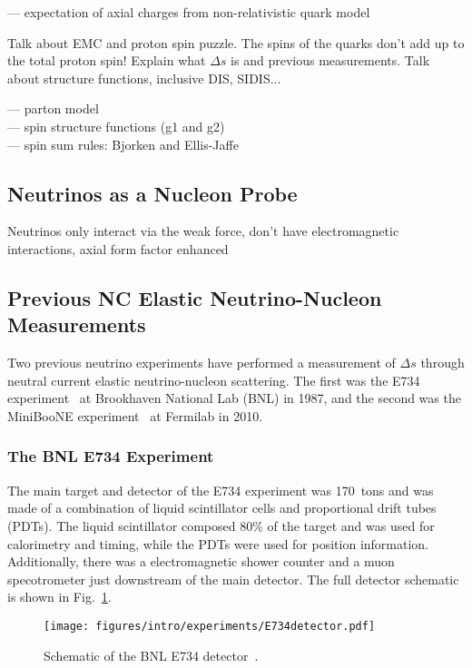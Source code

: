   --- expectation of axial charges from non-relativistic quark model

  Talk about EMC and proton spin puzzle. The spins of the quarks don't add up
  to the total proton spin! Explain what $\Delta s$ is and previous
  measurements. Talk about structure functions, inclusive DIS, SIDIS...

  --- parton model \\
  --- spin structure functions (g1 and g2) \\
  --- spin sum rules: Bjorken and Ellis-Jaffe \\


\subsection{Neutrinos as a Nucleon Probe}\label{sec:neutrinos}

  Neutrinos only interact via the weak force, don't have electromagnetic
  interactions, axial form factor enhanced

  \subsection{Previous NC Elastic Neutrino-Nucleon Measurements}
  \label{sec:measurements}
    Two previous neutrino experiments have performed a measurement of $\Delta
    s$ through neutral current elastic neutrino-nucleon scattering. The first
    was the E734 experiment~\cite{E734nce} at Brookhaven National Lab (BNL) in
    1987, and the second was the MiniBooNE experiment~\cite{MiniBooNEnce} at
    Fermilab in 2010.

    \subsubsection{The BNL E734 Experiment}\label{sec:e734}
    The main target and detector of the E734 experiment was 170~tons and was
    made of a combination of liquid scintillator cells and proportional drift
    tubes (PDTs). The liquid scintillator composed 80\% of the target and was
    used for calorimetry and timing, while the PDTs were used for position
    information. Additionally, there was a electromagnetic shower counter and a
    muon specotrometer just downstream of the main detector. The full detector
    schematic is shown in Fig.~\ref{fig:e734detector}.
    \begin{figure}[h]
      \centering
      \texttt{[image: figures/intro/experiments/E734detector.pdf]}
      \caption{Schematic of the BNL E734 detector~\cite{E734nce}.}
      \label{fig:e734detector}
    \end{figure}

